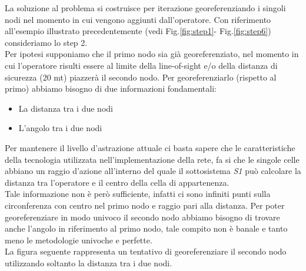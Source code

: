 La soluzione al problema si costruisce per iterazione georeferenziando i singoli nodi nel momento in cui vengono aggiunti dall'operatore. Con riferimento all'esempio illustrato precedentemente (vedi Fig.\ref{fig:step1}- Fig.\ref{fig:step6}) consideriamo lo step 2.\\
Per ipotesi supponiamo che il primo nodo sia già georeferenziato, nel momento in cui l'operatore risulti essere al limite della line-of-sight e/o della distanza di sicurezza (20 mt) piazzerà il secondo nodo. Per georeferenziarlo (rispetto al primo) abbiamo bisogno di due informazioni fondamentali:
\begin{itemize}
	\item La distanza tra i due nodi
	\item L'angolo tra i due nodi
\end{itemize} 
Per mantenere il livello d'astrazione attuale ci basta sapere che le caratteristiche della tecnologia utilizzata nell'implementazione della rete, fa si che le singole celle abbiano un raggio d'azione all'interno del quale il sottosistema \textit{S1} può calcolare la distanza tra l'operatore e il centro della cella di appartenenza.\\
Tale informazione non è però sufficiente, infatti ci sono infiniti punti sulla circonferenza con centro nel primo nodo e raggio pari alla distanza. Per poter georeferenziare in modo univoco il secondo nodo abbiamo bisogno di trovare anche l'angolo in riferimento al primo nodo, tale compito non è banale e tanto meno le metodologie univoche e perfette.\\
La figura seguente rappresenta un tentativo di georeferenziare il secondo nodo utilizzando soltanto la distanza tra i due nodi.
